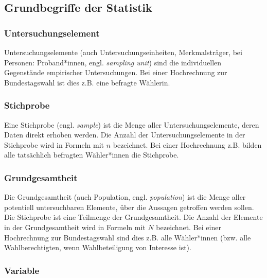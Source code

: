 \documentclass[
  11pt,
  ngerman,
  a4paper,
]{report}
\begin{document}
\hypertarget{grundbegriffe-der-statistik}{%
\subsection{Grundbegriffe der Statistik}\label{grundbegriffe-der-statistik}}

\nopagebreak

\hypertarget{untersuchungselement}{%
\subsubsection{Untersuchungselement}\label{untersuchungselement}}

Untersuchungselemente (auch Untersuchungseinheiten, Merkmalsträger, bei Personen: Proband*innen, engl. \emph{sampling unit}) sind die individuellen Gegenstände empirischer Untersuchungen. Bei einer Hochrechnung zur Bundestagswahl ist dies z.B. eine befragte Wählerin.

\hypertarget{stichprobe}{%
\subsubsection{Stichprobe}\label{stichprobe}}

Eine Stichprobe (engl. \emph{sample}) ist die Menge aller Untersuchungselemente, deren Daten direkt erhoben werden. Die Anzahl der Untersuchungselemente in der Stichprobe wird in Formeln mit \(n\) bezeichnet. Bei einer Hochrechnung z.B. bilden alle tatsächlich befragten Wähler*innen die Stichprobe.

\hypertarget{grundgesamtheit}{%
\subsubsection{Grundgesamtheit}\label{grundgesamtheit}}

Die Grundgesamtheit (auch Population, engl. \emph{population}) ist die Menge aller potentiell untersuchbaren Elemente, über die Aussagen getroffen werden sollen. Die Stichprobe ist eine Teilmenge der Grundgesamtheit. Die Anzahl der Elemente in der Grundgesamtheit wird in Formeln mit \(N\) bezeichnet. Bei einer Hochrechnung zur Bundestagswahl sind dies z.B. alle Wähler*innen (bzw. alle Wahlberechtigten, wenn Wahlbeteiligung von Interesse ist).

\hypertarget{variable}{%
\subsubsection{Variable}\label{variable}}
\end{document}
